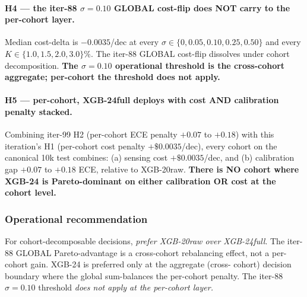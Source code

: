 \paragraph{H4 --- the iter-88 $\sigma{=}0.10$ GLOBAL cost-flip does NOT carry to the per-cohort layer.}
Median cost-delta is $-0.0035$/dec at every
$\sigma \in \{0, 0.05, 0.10, 0.25, 0.50\}$ and every $K \in
\{1.0, 1.5, 2.0, 3.0\}\%$. The iter-88 GLOBAL cost-flip dissolves under
cohort decomposition. \textbf{The $\sigma{=}0.10$ operational threshold
is the cross-cohort aggregate; per-cohort the threshold does not apply.}

\paragraph{H5 --- per-cohort, XGB-24full deploys with cost AND calibration penalty stacked.}
Combining iter-99 H2 (per-cohort ECE penalty $+0.07$ to $+0.18$) with
this iteration's H1 (per-cohort cost penalty $+\$0.0035$/dec), every cohort on
the canonical 10k test combines: (a) sensing cost $+\$0.0035$/dec, and
(b) calibration gap $+0.07$ to $+0.18$ ECE, relative to XGB-20raw.
\textbf{There is NO cohort where XGB-24 is Pareto-dominant on either
calibration OR cost at the cohort level.}

\subsubsection{Operational recommendation}
For cohort-decomposable decisions, \emph{prefer XGB-20raw over XGB-24full}.
The iter-88 GLOBAL Pareto-advantage is a cross-cohort rebalancing effect,
not a per-cohort gain. XGB-24 is preferred only at the aggregate (cross-
cohort) decision boundary where the global sum-balances the per-cohort
penalty. The iter-88 $\sigma{=}0.10$ threshold \emph{does not apply at
the per-cohort layer.}
